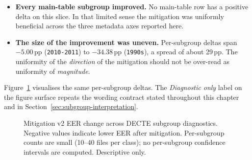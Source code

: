 \begin{itemize}
    \item \textbf{Every main-table subgroup improved.} No main-table row has a
        positive delta on this slice. In that limited sense the
        mitigation was uniformly beneficial across the three metadata
        axes reported here.
    \item \textbf{The size of the improvement was uneven.} Per-subgroup deltas
        span $-5.00$\,pp (\texttt{2010-2011}) to $-34.38$\,pp (\texttt{1990s}), a spread of
        about 29\,pp. The uniformity of the \emph{direction} of the mitigation
        should not be over-read as uniformity of \emph{magnitude}.
\end{itemize}

Figure~\ref{fig:subgroup-mitigation-delta} visualises the same
per-subgroup deltas. The \emph{Diagnostic only} label on the figure
surface repeats the wording contract stated throughout this
chapter and in Section~\ref{sec:subgroup-interpretation}.

\begin{figure}[t]
\centering
{}
\caption{Mitigation v2 EER change across DECTE subgroup diagnostics. Negative values indicate lower EER after mitigation. Per-subgroup counts are small (10--40 files per class); no per-subgroup confidence intervals are computed. Descriptive only.}
\label{fig:subgroup-mitigation-delta}
\end{figure}


